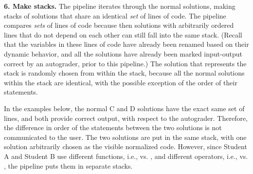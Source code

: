 {\bf 6. Make stacks.} The pipeline iterates through the normal solutions, making stacks of solutions that share an identical {\it set} of lines of code. The pipeline compares {\it sets} of lines of code because then solutions with arbitrarily ordered lines that do not depend on each other can still fall into the same stack. (Recall that the variables in these lines of code have already been renamed based on their dynamic behavior, and all the solutions have already been marked input-output correct by an autograder, prior to this pipeline.) The solution that represents the stack is randomly chosen from within the stack, because all the normal solutions within the stack are identical, with the possible exception of the order of their statements. 

In the examples below, the normal C and D solutions have the exact same set of lines, and both provide correct output, with respect to the autograder. Therefore, the difference in order of the statements between the two solutions is not communicated to the user. The two solutions are put in the same stack, with one solution arbitrarily chosen as the visible normalized code. However, since Student A and Student B use different functions, i.e.,  vs. , and different operators, i.e., \codevar{*=} vs. \codevar{=,*}, the pipeline puts them in separate stacks.


